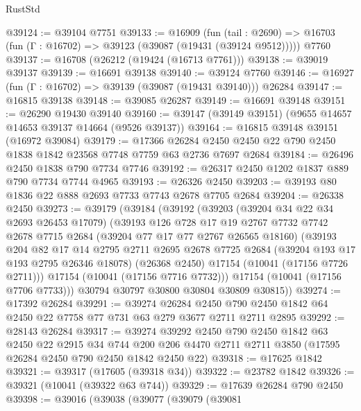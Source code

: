\begin{lexlean}{RustStd}
\begin{coremodule}
@39124 := @39104 @7751
@39133 := @16909
    (fun (tail : @2690) => @16703 (fun (Γ : @16702) => @39123 (@39087 (@19431 (@39124 @9512)))))
    @7760
@39137 := @16708 (@26212 (@19424 (@16713 @7761)))
@39138 := @39019 @39137
@39139 := @16691 @39138
@39140 := @39124 @7760
@39146 := @16927 (fun (Γ : @16702) => @39139 (@39087 (@19431 @39140))) @26284
@39147 := @16815 @39138
@39148 := @39085 @26287
@39149 := @16691 @39148
@39151 := @26290 @19430 @39140
@39160 := @39147 (@39149 @39151) (@9655 @14657 @14653 @39137 @14664 (@9526 @39137))
@39164 := @16815 @39148 @39151 (@16972 @39084)
@39179 := @17366
    @26284
    @2450
    @2450
    @22
    @790
    @2450
    @1838
    @1842
    @23568
    @7748
    @7759
    @63
    @2736
    @7697
    @2684
@39184 := @26496 @2450 @1838 @790 @7734 @7746
@39192 := @26317 @2450 @1202 @1837 @889 @790 @7734 @7744 @4965
@39193 := @26326 @2450
@39203 := @39193 @80 @1836 @22 @888 @2693 @7733 @7743 @2678 @7705 @2684
@39204 := @26338 @2450
@39273 := @39179
    (@39184
      (@39192
        (@39203
          (@39204 @34 @22 @34 @2693 @26453 @17079)
          (@39193
            @126
            @728
            @17
            @19
            @2767
            @7732
            @7742
            @2678
            @7715
            @2684
            (@39204 @77 @17 @77 @2767 @26565 @18160)
            (@39193
              @204
              @82
              @17
              @14
              @2795
              @2711
              @2695
              @2678
              @7725
              @2684
              (@39204 @193 @17 @193 @2795 @26346 @18078)
              (@26368 @2450)
              @17154
              (@10041 (@17156 @7726 @2711)))
            @17154
            (@10041 (@17156 @7716 @7732)))
          @17154
          (@10041 (@17156 @7706 @7733)))
        @30794
        @30797
        @30800
        @30804
        @30809
        @30815))
@39274 := @17392 @26284
@39291 := @39274
    @26284
    @2450
    @790
    @2450
    @1842
    @64
    @2450
    @22
    @7758
    @77
    @731
    @63
    @279
    @3677
    @2711
    @2711
    @2895
@39292 := @28143 @26284
@39317 := @39274
    @39292
    @2450
    @790
    @2450
    @1842
    @63
    @2450
    @22
    @2915
    @34
    @744
    @200
    @206
    @4470
    @2711
    @2711
    @3850
    (@17595 @26284 @2450 @790 @2450 @1842 @2450 @22)
@39318 := @17625 @1842
@39321 := @39317 (@17605 (@39318 @34))
@39322 := @23782 @1842
@39326 := @39321 (@10041 (@39322 @63 @744))
@39329 := @17639 @26284 @790 @2450
@39398 := @39016
    (@39038
      (@39077
        (@39079
          (@39081

\end{coremodule}
\end{lexlean}
